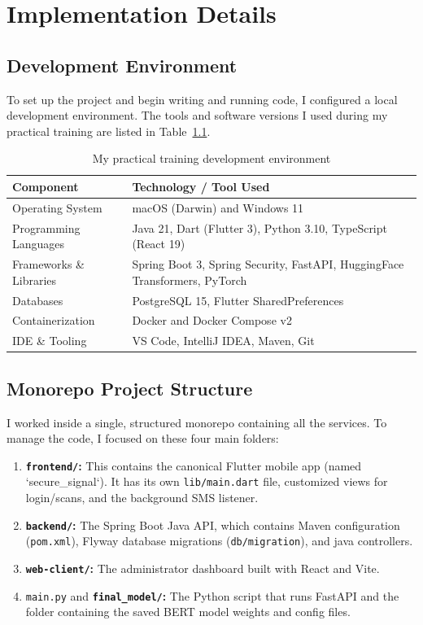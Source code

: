 \chapter{Implementation Details}
\label{ch:implementation}

\section{Development Environment}
To set up the project and begin writing and running code, I configured a local development environment. The tools and software versions I used during my practical training are listed in Table~\ref{tab:development-environment}.

\begin{table}[htbp]
  \centering
  \caption{My practical training development environment}
  \label{tab:development-environment}
  \begin{tabularx}{\textwidth}{p{} X}
    \toprule
    \textbf{Component} & \textbf{Technology / Tool Used}\\
    \midrule
    Operating System & macOS (Darwin) and Windows 11 \\
    Programming Languages & Java 21, Dart (Flutter 3), Python 3.10, TypeScript (React 19)\\
    Frameworks \& Libraries & Spring Boot 3, Spring Security, FastAPI, HuggingFace Transformers, PyTorch\\
    Databases & PostgreSQL 15, Flutter SharedPreferences\\
    Containerization & Docker and Docker Compose v2\\
    IDE \& Tooling & VS Code, IntelliJ IDEA, Maven, Git\\
    \bottomrule
  \end{tabularx}
\end{table}

\section{Monorepo Project Structure}
I worked inside a single, structured monorepo containing all the services. To manage the code, I focused on these four main folders:
\begin{enumerate}
  \item \textbf{\texttt{frontend/}:} This contains the canonical Flutter mobile app (named `secure_signal`). It has its own \texttt{lib/main.dart} file, customized views for login/scans, and the background SMS listener.
  \item \textbf{\texttt{backend/}:} The Spring Boot Java API, which contains Maven configuration (\texttt{pom.xml}), Flyway database migrations (\texttt{db/migration}), and java controllers.
  \item \textbf{\texttt{web-client/}:} The administrator dashboard built with React and Vite.
  \item \texttt{main.py} and \textbf{\texttt{final\_model/}:} The Python script that runs FastAPI and the folder containing the saved BERT model weights and config files.
\end{enumerate}


